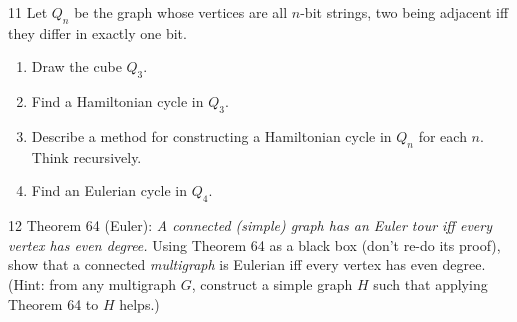 \begin{exercise}{11}
    Let $Q_n$ be the graph whose vertices are all $n$-bit strings, two being
    adjacent iff they differ in exactly one bit.
    \begin{enumerate}[label=(\alph*)]
        \item Draw the cube $Q_3$.
        \item Find a Hamiltonian cycle in $Q_3$.
        \item Describe a method for constructing a Hamiltonian cycle in $Q_n$ for
              each $n$. Think recursively.
        \item Find an Eulerian cycle in $Q_4$.
    \end{enumerate}
\end{exercise}

\begin{exercise}{12}
    Theorem 64 (Euler): \emph{A connected (simple) graph has an Euler tour iff
    every vertex has even degree.} Using Theorem 64 as a black box (don't re-do
    its proof), show that a connected \emph{multigraph} is Eulerian iff every
    vertex has even degree. (Hint: from any multigraph $G$, construct a simple
    graph $H$ such that applying Theorem 64 to $H$ helps.)
\end{exercise}
